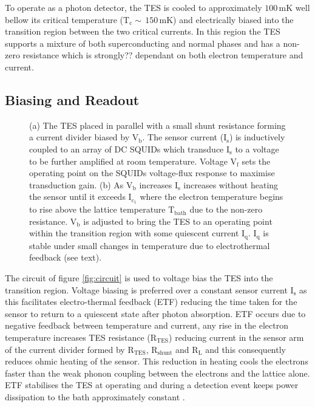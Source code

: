 \documentclass{article}
\begin{document}
\newpage

To operate as a photon detector, the TES is cooled to approximately
$100\,\mathrm{mK}$ well bellow its critical temperature 
($\mathrm{T}_\mathrm{c}\sim\,150\,\mathrm{mK}$) and electrically biased into the
transition region between the two critical currents.
In this region the TES supports a mixture of both superconducting and normal
phases and has a non-zero resistance which is strongly?? dependant on both
electron temperature and current.

\subsection{Biasing and Readout}

\begin{figure}[!hpbt]
  \caption{
    (a) The TES placed in parallel with a small shunt resistance forming a
    current divider biased by $\mathrm{V}_\mathrm{b}$. The sensor
    current ($\mathrm{I}_\mathrm{s}$) is inductively coupled to an array of DC
    SQUIDs which transduce $\mathrm{I}_\mathrm{s}$ to a voltage to be further
    amplified at room temperature. Voltage $\mathrm{V}_\mathrm{f}$ sets the
    operating point on the SQUIDs voltage-flux response to maximise transduction
    gain.
    (b) As $\mathrm{V}_\mathrm{b}$ increases $\mathrm{I}_\mathrm{s}$
    increases without heating the sensor until it
    exceeds $\mathrm{I}_{\mathrm{c}_1}$ where the electron temperature 
    begins to rise above the lattice temperature $\mathrm{T}_\mathrm{bath}$
    due to the non-zero resistance. $\mathrm{V}_\mathrm{b}$ is adjusted to bring
    the TES to an operating point within the transition region with some
    quiescent current $\mathrm{I}_\mathrm{q}$. $\mathrm{I}_\mathrm{q}$ is stable
    under small changes in temperature due to electrothermal feedback (see
    text).
  }
\end{figure}

The circuit of figure \ref{fig:circuit} is used to voltage bias the TES into the
transition region. 
Voltage biasing is preferred over a constant sensor current
$\mathrm{I}_\mathrm{s}$ as this facilitates electro-thermal feedback (ETF)
reducing the time taken for the sensor to return to a quiescent state after
photon absorption. 
ETF occurs due to negative feedback between temperature and current, any rise
in the electron temperature increases TES resistance
($\mathrm{R}_\mathrm{TES}$) reducing current in the sensor arm of the current
divider formed by $\mathrm{R}_\mathrm{TES}$, $\mathrm{R}_\mathrm{shunt}$ and
$\mathrm{R}_\mathrm{L}$ and this consequently reduces ohmic heating of the
sensor.
This reduction in heating cools the electrons faster than the weak phonon
coupling between the electrons and the lattice alone.
ETF stabilises the TES at operating and during a detection event keeps
power dissipation to the bath approximately constant \cite{SaeWooNam:1999hz}.
\end{document}
